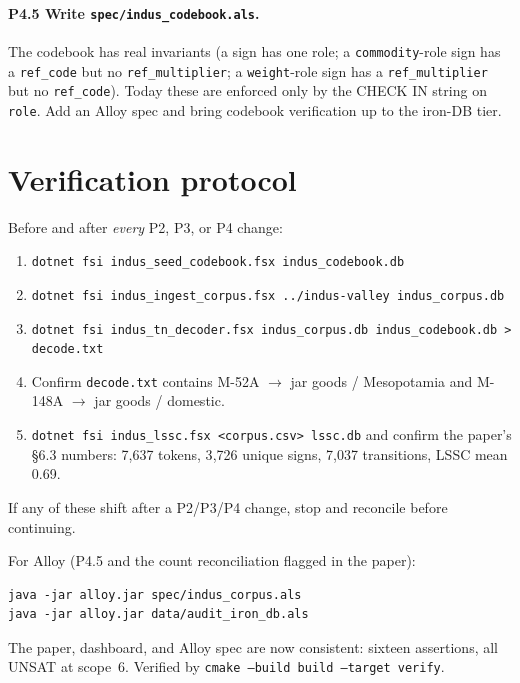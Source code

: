 \documentclass[11pt]{article}
\begin{document}
\paragraph{P4.5 Write \texttt{spec/indus\_codebook.als}.}
The codebook has real invariants (a sign has one role; a
\texttt{commodity}-role sign has a \texttt{ref\_code} but no
\texttt{ref\_multiplier}; a \texttt{weight}-role sign has a
\texttt{ref\_multiplier} but no \texttt{ref\_code}).  Today
these are enforced only by the CHECK IN string on
\texttt{role}.  Add an Alloy spec and bring codebook
verification up to the iron-DB tier.

\section{Verification protocol}

Before and after \emph{every} P2, P3, or P4 change:

\begin{enumerate}[leftmargin=2em]
\item \texttt{dotnet fsi indus\_seed\_codebook.fsx indus\_codebook.db}
\item \texttt{dotnet fsi indus\_ingest\_corpus.fsx
  ../indus-valley indus\_corpus.db}
\item \texttt{dotnet fsi indus\_tn\_decoder.fsx
  indus\_corpus.db indus\_codebook.db > decode.txt}
\item Confirm \texttt{decode.txt} contains M-52A $\to$ jar
  goods / Mesopotamia and M-148A $\to$ jar goods / domestic.
\item \texttt{dotnet fsi indus\_lssc.fsx <corpus.csv> lssc.db}
  and confirm the paper's \S6.3 numbers: 7{,}637 tokens,
  3{,}726 unique signs, 7{,}037 transitions, LSSC mean 0.69.
\end{enumerate}

If any of these shift after a P2/P3/P4 change, stop and
reconcile before continuing.

For Alloy (P4.5 and the count reconciliation flagged in the
paper):

\begin{Verbatim}[fontsize=\small]
java -jar alloy.jar spec/indus_corpus.als
java -jar alloy.jar data/audit_iron_db.als
\end{Verbatim}

The paper, dashboard, and Alloy spec are now consistent:
sixteen assertions, all UNSAT at scope~6.  Verified by
\texttt{cmake --build build --target verify}.
\end{document}
